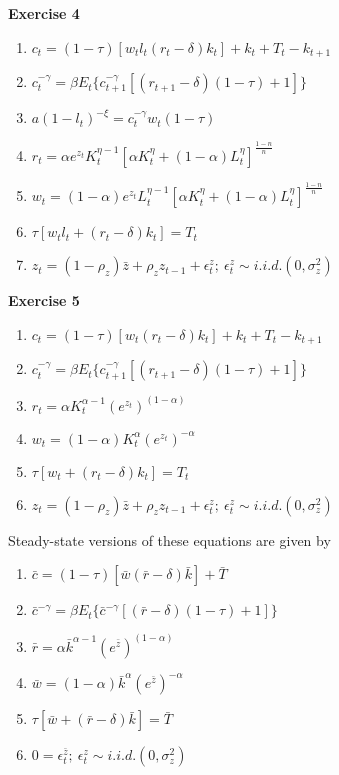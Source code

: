 \documentclass[letterpaper,12pt]{article}
\begin{document}
\textbf{Exercise 4}

\begin{enumerate}
	\item $c_t = (1 - \tau)[w_t l_t (r_t - \delta) k_t] + k_t + T_t - k_{t+1}$
	\item $c_t^{-\gamma} = \beta E_t \{c_{t+1}^{-\gamma} [(r_{t+1} - \delta)(1 - \tau) + 1]\}$
	\item $a (1 - l_t)^{-\xi} = c_t^{-\gamma} w_t (1 - \tau)$
	\item $r_t = \alpha e^{z_t} K_t^{\eta - 1} [\alpha K_t^\eta + (1 - \alpha) L_t^\eta]^{\frac{1-n}{n}}$
	\item $w_t = (1 - \alpha) e^{z_t} L_t^{\eta - 1}[\alpha K_t^\eta + (1 - \alpha)L_t^\eta]^{\frac{1-n}{n}}$
	\item $\tau[w_t l_t + (r_t - \delta) k_t] = T_t$
	\item $z_t = (1 - \rho_z) \bar{z} + \rho_z z_{t-1} + \epsilon_t^z; \ \epsilon_t^z \sim i.i.d.(0, \sigma_z^2)$
\end{enumerate}

\textbf{Exercise 5}

\begin{enumerate}
	\item $c_t = (1 - \tau)[w_t (r_t - \delta) k_t] + k_t + T_t - k_{t+1}$
	\item $c_t^{-\gamma} = \beta E_t \{c_{t+1}^{-\gamma} [(r_{t+1} - \delta)(1 - \tau) + 1]\}$
	\item $r_t = \alpha K_t^{\alpha-1} (e^{z_t})^{(1 - \alpha)}$
	\item $w_t = (1 - \alpha) K_t^\alpha (e^{z_t}) ^{-\alpha}$
	\item $\tau[w_t + (r_t - \delta) k_t] = T_t$
	\item $z_t = (1 - \rho_z) \bar{z} + \rho_z z_{t-1} + \epsilon_t^z; \ \epsilon_t^z \sim i.i.d.(0, \sigma_z^2)$
\end{enumerate}

Steady-state versions of these equations are given by
\begin{enumerate}
	\item $\bar{c} = (1 - \tau)[\bar{w} (\bar{r} - \delta) \bar{k}]  + \bar{T} $
	\item $\bar{c}^{-\gamma} = \beta E_t \{\bar{c}^{-\gamma} [(\bar{r} - \delta)(1 - \tau) + 1]\}$
	\item $\bar{r} = \alpha \bar{k}^{\alpha-1} (e^{\bar{z}})^{(1 - \alpha)}$
	\item $\bar{w} = (1 - \alpha) \bar{k}^\alpha (e^{\bar{z}}) ^{-\alpha}$
	\item $\tau[\bar{w} + (\bar{r} - \delta) \bar{k}] = \bar{T}$
	\item $0 = \epsilon_t^{\bar{z}}; \ \epsilon_t^z \sim i.i.d.(0, \sigma_z^2)$
\end{enumerate}
\end{document}
